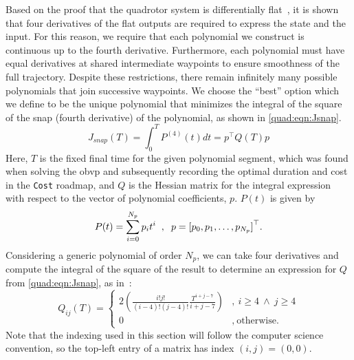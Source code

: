Based on the proof that the quadrotor system is differentially flat~\cite{Mellinger2011}, it is shown that four derivatives of the flat outputs are required to express the state and the input. For this reason, we require that each polynomial we construct is continuous up to the fourth derivative. Furthermore, each polynomial must have equal derivatives at shared intermediate waypoints to ensure smoothness of the full trajectory. Despite these restrictions, there remain infinitely many possible polynomials that join successive waypoints. We choose the ``best'' option which we define to be the unique polynomial that minimizes the integral of the square of the snap (fourth derivative) of the polynomial, as shown in \autoref{quad:eqn:Jsnap}.
\begin{equation}
    J_{snap}(T) = \int_0^T P^{(4)}(t)dt = p^\top Q(T) p
\label{quad:eqn:Jsnap}
\end{equation}
Here, $T$ is the fixed final time for the given polynomial segment, which was found when solving the \gls{obvp} and subsequently recording the optimal duration and cost in the \texttt{Cost} roadmap, and $Q$ is the Hessian matrix for the integral expression with respect to the vector of polynomial coefficients, $p$. $P(t)$ is given by
\begin{equation}
    P(t) = \sum_{i=0}^{N_p} p_i t^i \hspace{2mm},
    \hspace{2mm} p = {[p_0, p_1, \mathellipsis, p_{N_p}]}^\top.
\end{equation}
Considering a generic polynomial of order $N_p$, we can take four derivatives and compute the integral of the square of the result to determine an expression for $Q$ from \autoref{quad:eqn:Jsnap}, as in~\cite{Allen2016}:
\begin{equation}
    Q_{ij}(T) = \begin{cases}
                    2\left( \frac{i!j!}{(i-4)!(j-4)!}\frac{T^{i+j-7}}{i+j-7}  \right) & ,\ i \geq 4 \ \land\ j \geq 4 \\
                    0 & ,\ \text{otherwise.}
                \end{cases}
\label{quad:eqn:Q}
\end{equation}
Note that the indexing used in this section will follow the computer science convention, so the top-left entry of a matrix has index $(i,j) = (0,0)$.

